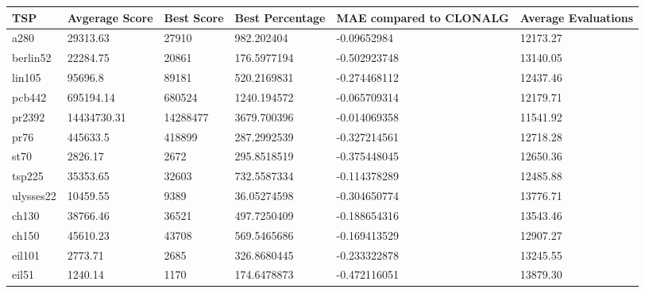 \begin{table}[H]
	\begin{tabular}{|l|l|l|l|p{2.5cm}|p{2cm}|}
		\hline
		TSP       & Avgerage Score & Best Score & Best Percentage    & MAE compared to CLONALG & Average Evaluations  \\ \hline
		a280      & 29313.63    & 27910     & 982.202404  & -0.09652984                                                     & 12173.27 \\ \hline
		berlin52  & 22284.75    & 20861     & 176.5977194 & -0.502923748                                                    & 13140.05 \\ \hline
		lin105    & 95696.8     & 89181     & 520.2169831 & -0.274468112                                                    & 12437.46 \\ \hline
		pcb442    & 695194.14   & 680524    & 1240.194572 & -0.065709314                                                    & 12179.71 \\ \hline
		pr2392    & 14434730.31 & 14288477  & 3679.700396 & -0.014069358                                                    & 11541.92 \\ \hline
		pr76      & 445633.5    & 418899    & 287.2992539 & -0.327214561                                                    & 12718.28 \\ \hline
		st70      & 2826.17     & 2672      & 295.8518519 & -0.375448045                                                    & 12650.36 \\ \hline
		tsp225    & 35353.65    & 32603     & 732.5587334 & -0.114378289                                                    & 12485.88 \\ \hline
		ulysses22 & 10459.55    & 9389      & 36.05274598 & -0.304650774                                                    & 13776.71 \\ \hline
		ch130     & 38766.46    & 36521     & 497.7250409 & -0.188654316                                                    & 13543.46 \\ \hline
		ch150     & 45610.23    & 43708     & 569.5465686 & -0.169413529                                                    & 12907.27 \\ \hline
		eil101    & 2773.71     & 2685      & 326.8680445 & -0.233322878                                                    & 13245.55 \\ \hline
		eil51     & 1240.14     & 1170      & 174.6478873 & -0.472116051                                                    & 13879.30 \\ \hline

\end{tabular}
\end{table}
